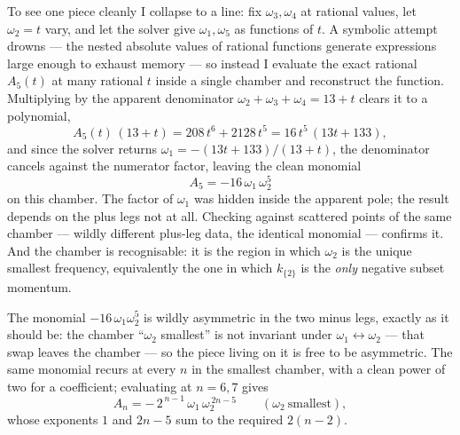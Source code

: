 \documentclass[11pt]{article}
\begin{document}
To see one piece cleanly I collapse to a line: fix $\omega_3,\omega_4$ at rational values, let
$\omega_2=t$ vary, and let the solver give $\omega_1,\omega_5$ as functions of $t$. A symbolic
attempt drowns --- the nested absolute values of rational functions generate expressions large
enough to exhaust memory --- so instead I evaluate the exact rational $A_5(t)$ at many rational
$t$ inside a single chamber and reconstruct the function. Multiplying by the apparent denominator
$\omega_2+\omega_3+\omega_4=13+t$ clears it to a polynomial,
\[
A_5(t)\,(13+t)=208\,t^6+2128\,t^5=16\,t^5\,(13t+133),
\]
and since the solver returns $\omega_1=-(13t+133)/(13+t)$, the denominator cancels against the
numerator factor, leaving the clean monomial
\[
A_5=-16\,\omega_1\,\omega_2^5
\]
on this chamber. The factor of $\omega_1$ was hidden inside the apparent pole; the result depends
on the plus legs not at all. Checking against scattered points of the same chamber --- wildly
different plus-leg data, the identical monomial --- confirms it. And the chamber is recognisable:
it is the region in which $\omega_2$ is the unique smallest frequency, equivalently the one in
which $k_{\{2\}}$ is the \emph{only} negative subset momentum.

The monomial $-16\,\omega_1\omega_2^5$ is wildly asymmetric in the two minus legs, exactly as it
should be: the chamber ``$\omega_2$ smallest'' is not invariant under
$\omega_1\leftrightarrow\omega_2$ --- that swap leaves the chamber --- so the piece living on it
is free to be asymmetric. The same monomial recurs at every $n$ in the smallest chamber, with a
clean power of two for a coefficient; evaluating at $n=6,7$ gives
\[
A_n=-\,2^{\,n-1}\,\omega_1\,\omega_2^{\,2n-5}\qquad(\omega_2\ \text{smallest}),
\]
whose exponents $1$ and $2n-5$ sum to the required $2(n-2)$.
\end{document}
